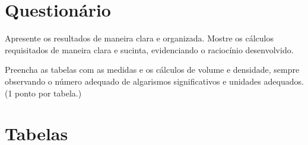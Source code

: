 
\vspace{15mm}

\begin{fullwidth}
\noindent{}
\vspace{5mm}

\noindent{}

\noindent{}

\noindent{}

\noindent{}

\noindent{}
\end{fullwidth}

\vspace{5mm}

\section{Questionário}

\begin{question}[type={exam}]{2}
Apresente os resultados de maneira clara e organizada. Mostre os cálculos requisitados de maneira clara e sucinta, evidenciando o raciocínio desenvolvido.
\end{question}

\begin{question}[type={exam}]{8}
Preencha as tabelas com as medidas e os cálculos de volume e densidade, sempre observando o número adequado de algarismos significativos e unidades adequados. (1 ponto por tabela.)
\end{question}



\vfill
\pagebreak
\section{Tabelas}

